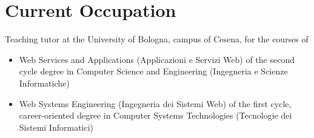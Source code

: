 \section{Current Occupation}

Teaching tutor at the University of Bologna, campus of Cesena, for the courses of
\begin{itemize}
  \item Web Services and Applications (Applicazioni e Servizi Web) of the second cycle degree in Computer Science and Engineering (Ingegneria e Scienze Informatiche)
  \item Web Systems Engineering (Ingegneria dei Sistemi Web) of the first cycle, career-oriented degree in Computer Systems Technologies (Tecnologie dei Sistemi Informatici)
\end{itemize}

\vspace{20pt}
